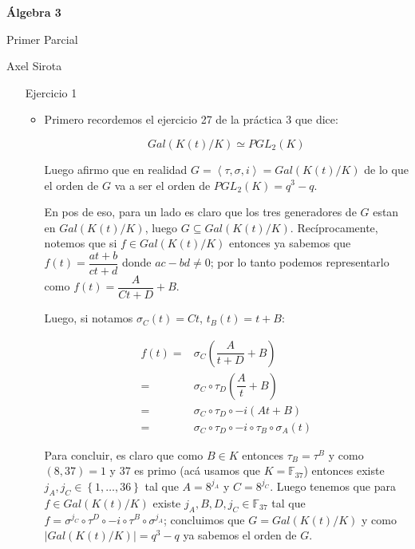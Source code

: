 \documentclass[11pt]{article}
\newcommand{\abs}[1]{\left\lvert#1\right\rvert}
\newcommand{\ip}[1]{\left\langle#1\right\rangle}
\newcommand{\sett}[1]{\left\lbrace#1\right\rbrace}
\numberwithin{theorem}{subsection}
\begin{document}
	
	\pagestyle{empty}
	\pagestyle{fancy}
	\fancyfoot[CO]{\slshape \thepage}
	\renewcommand{\headrulewidth}{0pt}
	
	
	
	\centerline{\bf \'Algebra 3}
	\centerline{\sc Primer Parcial}
	\centerline{\sc Axel Sirota}
	
\begin{enumerate}
	\item[Ejercicio 1] 
	
	\begin{itemize}
		\item 
	Primero recordemos el ejercicio 27 de la pr\'actica 3 que dice:
	
	\begin{equation*}
		Gal \left(K(t) / K\right) \simeq PGL_2(K)
	\end{equation*}
	
	Luego afirmo que en realidad $G = \ip{\tau, \sigma, i} = Gal \left(K(t) / K\right)$ de lo que el orden de $G$ va a ser el orden de $PGL_2(K) = q^3 - q$.
	
	En pos de eso, para un lado es claro que los tres generadores de $G$ estan en $Gal \left(K(t) / K\right)$, luego $G \subseteq Gal \left(K(t) / K\right)$. Rec\'iprocamente,  notemos que si $f \in Gal \left(K(t) / K\right)$ entonces ya sabemos que $f(t) = \dfrac{at+b}{ct+d}$ donde $ac-bd \neq 0$; por lo tanto podemos representarlo como $f(t) = \dfrac{A}{Ct + D} + B$.
	
	Luego, si notamos $\sigma_C(t) = Ct$, $t_B(t) = t + B$:
	
	\begin{equation*}
		\begin{aligned}
			f(t) = & \sigma_C\left(\dfrac{A}{t + D} + B\right) \\
			= & \sigma_C \circ \tau_D \left(\dfrac{A}{t} + B\right) \\
			= & \sigma_C \circ \tau_D \circ -i \left(At + B\right) \\
			= & \sigma_C \circ \tau_D \circ -i \circ \tau_B \circ \sigma_A(t)
		\end{aligned}
	\end{equation*}
	
	Para concluir, es claro que como $B \in K$ entonces $\tau_B = \tau^{B}$ y como $\left(8, 37\right) = 1$ y $37$ es primo (ac\'a usamos que $K = \mathbb{F}_{37}$) entonces existe $j_A, j_C \in \sett{1, \dots, 36}$ tal que $A = 8^{j_A}$ y $C = 8^{j_C}$. Luego tenemos que para $f \in Gal \left(K(t) / K\right)$ existe $j_A, B, D, j_C \in \mathbb{F}_{37}$ tal que $f = \sigma^{j_C} \circ \tau^{D} \circ -i \circ \tau^{B} \circ \sigma^{j_A}$; concluimos que $G = Gal \left(K(t) / K\right)$ y como $\abs{Gal \left(K(t) / K\right)} = q^3 - q$ ya sabemos el orden de $G$.
	

\end{itemize}
\end{enumerate}
\end{document}
